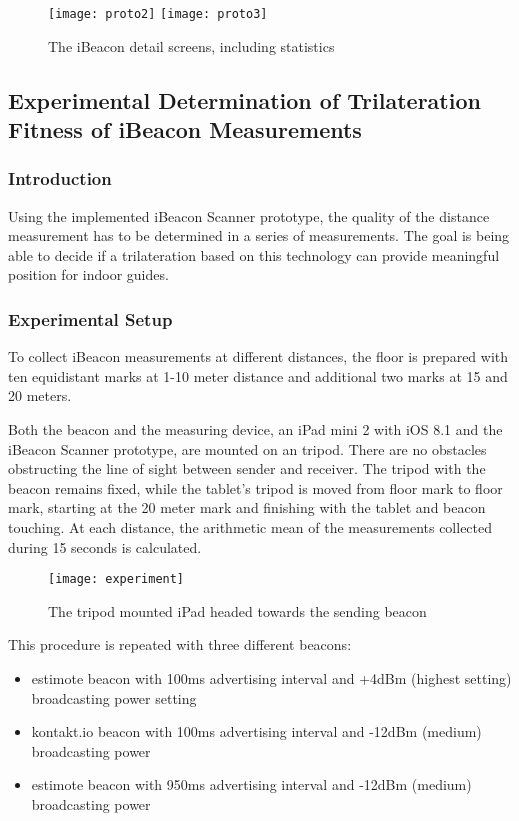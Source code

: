\begin{figure}[H]
\centering
\texttt{[image: proto2]}
\texttt{[image: proto3]}
\caption{The iBeacon detail screens, including statistics}
\end{figure}

\subsection{Experimental Determination of Trilateration Fitness of iBeacon Measurements}

\subsubsection*{Introduction}

Using the implemented iBeacon Scanner prototype, the quality of the distance measurement has to be determined in a series of measurements. The goal is being able to decide if a trilateration based on this technology can provide meaningful position for indoor guides.

\subsubsection*{Experimental Setup}

To collect iBeacon measurements at different distances, the floor is prepared with ten equidistant marks at 1-10 meter distance and additional two marks at 15 and 20 meters.

Both the beacon and the measuring device, an iPad mini 2 with iOS 8.1 and the iBeacon Scanner prototype, are mounted on an tripod. There are no obstacles obstructing the line of sight between sender and receiver. The tripod with the beacon remains fixed, while the tablet's tripod is moved from floor mark to floor mark, starting at the 20 meter mark and finishing with the tablet and beacon touching. At each distance, the arithmetic mean of the measurements collected during 15 seconds is calculated. 

\begin{figure}[H]
\centering
\texttt{[image: experiment]}
\caption{The tripod mounted iPad headed towards the sending beacon}
\end{figure}

This procedure is repeated with three different beacons:

\begin{itemize}
\item estimote beacon with 100ms advertising interval and +4dBm (highest setting) broadcasting power setting
\item kontakt.io beacon with 100ms advertising interval and -12dBm (medium) broadcasting power
\item estimote beacon with 950ms advertising interval and -12dBm (medium) broadcasting power
\end{itemize}

